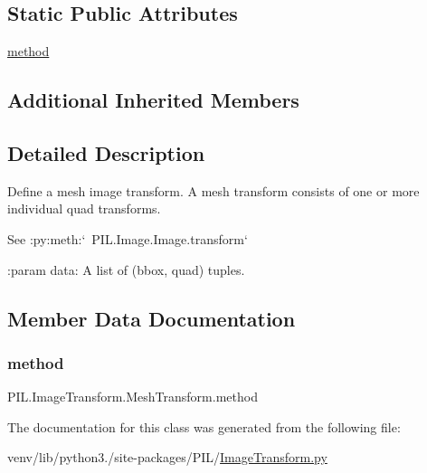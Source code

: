 \subsection*{Static Public Attributes}
\begin{DoxyCompactItemize}
\item 
\hyperlink{classPIL_1_1ImageTransform_1_1MeshTransform_ae835b7cd3e8cbad2a1dc064cb1f51eb9}{method}
\end{DoxyCompactItemize}
\subsection*{Additional Inherited Members}


\subsection{Detailed Description}
\begin{DoxyVerb}Define a mesh image transform.  A mesh transform consists of one or more
individual quad transforms.

See :py:meth:`~PIL.Image.Image.transform`

:param data: A list of (bbox, quad) tuples.
\end{DoxyVerb}
 

\subsection{Member Data Documentation}
\mbox{\label{classPIL_1_1ImageTransform_1_1MeshTransform_ae835b7cd3e8cbad2a1dc064cb1f51eb9}} 
\subsubsection{\texorpdfstring{method}{method}}
{\footnotesize\ttfamily P\+I\+L.\+Image\+Transform.\+Mesh\+Transform.\+method\hspace{0.3cm}{\ttfamily [static]}}



The documentation for this class was generated from the following file\+:\begin{DoxyCompactItemize}
\item 
venv/lib/python3./site-\/packages/\+P\+I\+L/\hyperlink{ImageTransform_8py}{Image\+Transform.\+py}\end{DoxyCompactItemize}
